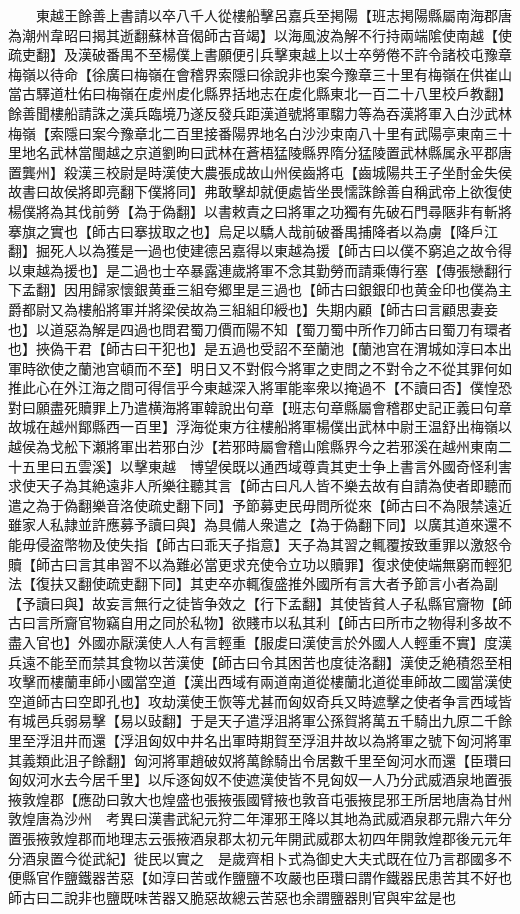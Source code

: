 　　東越王餘善上書請以卒八千人從樓船擊呂嘉兵至掲陽【班志掲陽縣屬南海郡唐為潮州韋昭曰揭其逝翻蘇林音偈師古音竭】以海風波為解不行持兩端隂使南越【使疏吏翻】及漢破番禺不至楊僕上書願便引兵擊東越上以士卒勞倦不許令諸校屯豫章梅嶺以待命【徐廣曰梅嶺在會稽界索隱曰徐說非也案今豫章三十里有梅嶺在供崔山當古驛道杜佑曰梅嶺在䖍州䖍化縣界括地志在䖍化縣東北一百二十八里校戶教翻】餘善聞樓船請誅之漢兵臨境乃遂反發兵距漢道號將軍騶力等為吞漢將軍入白沙武林梅嶺【索隱曰案今豫章北二百里接番陽界地名白沙沙束南八十里有武陽亭東南三十里地名武林當閩越之京道劉昫曰武林在蒼梧猛陵縣界隋分猛陵置武林縣属永平郡唐置龔州】殺漢三校尉是時漢使大農張成故山州侯齒將屯【齒城陽共王子坐酎金失侯故書曰故侯將即亮翻下僕將同】弗敢擊却就便處皆坐畏懦誅餘善自稱武帝上欲復使楊僕將為其伐前勞【為于偽翻】以書敕責之曰將軍之功獨有先破石門尋陿非有斬將搴旗之實也【師古曰搴拔取之也】烏足以驕人哉前破番禺捕降者以為虜【降戶江翻】掘死人以為獲是一過也使建德呂嘉得以東越為援【師古曰以僕不窮追之故令得以東越為援也】是二過也士卒暴露連歲將軍不念其勤勞而請乘傳行塞【傳張戀翻行下孟翻】因用歸家懷銀黄垂三組夸郷里是三過也【師古曰銀銀印也黄金印也僕為主爵都尉又為樓船將軍并將梁侯故為三組組印綬也】失期内顧【師古曰言顧思妻妾也】以道惡為解是四過也問君蜀刀價而陽不知【蜀刀蜀中所作刀師古曰蜀刀有環者也】挾偽干君【師古曰干犯也】是五過也受詔不至蘭池【蘭池宫在渭城如淳曰本出軍時欲使之蘭池宫頓而不至】明日又不對假今將軍之吏問之不對令之不從其罪何如推此心在外江海之間可得信乎今東越深入將軍能率衆以掩過不【不讀曰否】僕惶恐對曰願盡死贖罪上乃遣横海將軍韓說出句章【班志句章縣屬會稽郡史記正義曰句章故城在越州鄮縣西一百里】浮海從東方往樓船將軍楊僕出武林中尉王温舒出梅嶺以越侯為戈舩下瀬將軍出若邪白沙【若邪時屬會稽山隂縣界今之若邪溪在越州東南二十五里曰五雲溪】以擊東越　博望侯既以通西域尊貴其吏士争上書言外國奇怪利害求使天子為其絶遠非人所樂往聽其言【師古曰凡人皆不樂去故有自請為使者即聽而遣之為于偽翻樂音洛使疏史翻下同】予節募吏民毋問所從來【師古曰不為限禁遠近雖家人私隷並許應募予讀曰與】為具備人衆遣之【為于偽翻下同】以廣其道來還不能毋侵盗幣物及使失指【師古曰乖天子指意】天子為其習之輒覆按致重罪以激怒令贖【師古曰言其串習不以為難必當更求充使令立功以贖罪】復求使使端無窮而輕犯法【復扶又翻使疏吏翻下同】其吏卒亦輒復盛推外國所有言大者予節言小者為副【予讀曰與】故妄言無行之徒皆争效之【行下孟翻】其使皆貧人子私縣官齎物【師古曰言所齎官物竊自用之同於私物】欲賤市以私其利【師古曰所市之物得利多故不盡入官也】外國亦厭漢使人人有言輕重【服䖍曰漢使言於外國人人輕重不實】度漢兵遠不能至而禁其食物以苦漢使【師古曰令其困苦也度徒洛翻】漢使乏絶積怨至相攻擊而樓蘭車師小國當空道【漢出西域有兩道南道從樓蘭北道從車師故二國當漢使空道師古曰空即孔也】攻劫漢使王恢等尤甚而匈奴奇兵又時遮擊之使者争言西域皆有城邑兵弱易擊【易以䜴翻】于是天子遣浮沮將軍公孫賀將萬五千騎出九原二千餘里至浮沮井而還【浮沮匈奴中井名出軍時期賀至浮沮井故以為將軍之號下匈河將軍其義類此沮子餘翻】匈河將軍趙破奴將萬餘騎出令居數千里至匈河水而還【臣瓚曰匈奴河水去今居千里】以斥逐匈奴不使遮漢使皆不見匈奴一人乃分武威酒泉地置張掖敦煌郡【應劭曰敦大也煌盛也張掖張國臂掖也敦音屯張掖昆邪王所居地唐為甘州敦煌唐為沙州　考異曰漢書武紀元狩二年渾邪王降以其地為武威酒泉郡元鼎六年分置張掖敦煌郡而地理志云張掖酒泉郡太初元年開武威郡太初四年開敦煌郡後元元年分酒泉置今從武紀】徙民以實之　是歲齊相卜式為御史大夫式既在位乃言郡國多不便縣官作鹽鐵器苦惡【如淳曰苦或作鹽鹽不攻嚴也臣瓚曰謂作鐵器民患苦其不好也師古曰二說非也鹽既味苦器又脆惡故總云苦惡也余謂鹽器則官與牢盆是也